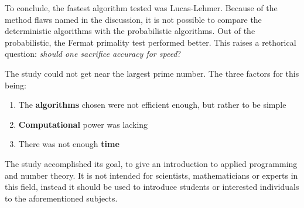 \documentclass[main.tex]{subfiles}
\begin{document}
To conclude, the fastest algorithm tested was Lucas-Lehmer. Because of the
method flaws named in the discussion, it is not possible to compare the
deterministic algorithms with the probabilistic algorithms. Out of the
probabilistic, the Fermat primality test performed better. This raises a
rethorical question: \emph{should one sacrifice accuracy for speed}?

The study could not get near the largest prime number. The three factors for
this being:

\begin{enumerate}
\item The \textbf{algorithms} chosen were not efficient enough, but rather to be
  simple
\item \textbf{Computational} power was lacking
\item There was not enough \textbf{time}
\end{enumerate}

The study accomplished its goal, to give an introduction to applied programming
and number theory. It is not intended for scientists, mathematicians or experts
in this field, instead it should be used to introduce students or interested
individuals to the aforementioned subjects.
\end{document}
